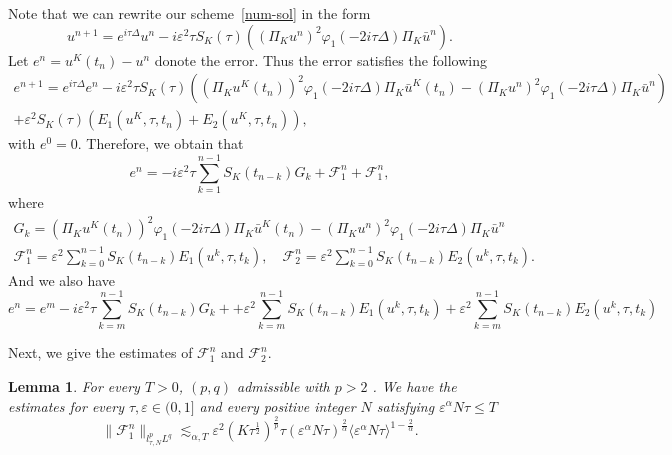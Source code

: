 \documentclass[10pt,a4paper]{article}
\newtheorem{lemma}[theorem]{Lemma}
\begin{document}
  Note that we can rewrite our scheme~\eqref{num-sol} in the form 
  \[ 
    u^{n+1} = e^{i\tau\Delta}u^n - i\varepsilon^2\tau S_K(\tau) 
    \left( (\Pi_K u^n)^2 \varphi_1(-2i\tau\Delta)\Pi_K \bar{u}^n \right).
  \]
  Let \( e^n = u^K(t_n) - u^n \) donote the error. Thus the error satisfies 
  the following 
  \begin{multline}
    e^{n+1} = e^{i\tau\Delta}e^n - i \varepsilon^2 \tau S_K(\tau) \left( 
    \left(\Pi_K u^K(t_n)\right)^2 \varphi_1(-2i\tau\Delta)\Pi_K \bar{u}^K(t_n)
    - (\Pi_K u^n)^2 \varphi_1(-2i\tau\Delta)\Pi_K \bar{u}^n \right) \\ 
    + \varepsilon^2 S_K(\tau) \left( E_1(u^K, \tau, t_n) + E_2(u^K, \tau, t_n) 
    \right),
  \end{multline}
  with \( e^0 = 0 \). Therefore, we obtain that 
  \begin{equation}
    e^n = -i \varepsilon^2 \tau \sum_{k=1}^{n-1}
    S_K(t_{n-k})G_k + \mathcal F_1^{n} + \mathcal F_1^{n},
  \end{equation}
  where
  \begin{align}
    \label{Gk} G_k = \left(\Pi_K u^K(t_n)\right)^2 \varphi_1(-2i\tau\Delta)\Pi_K 
    \bar{u}^K(t_n) - (\Pi_K u^n)^2 \varphi_1(-2i\tau\Delta)\Pi_K \bar{u}^n \\
    \label{F1F2} \mathcal F^{n}_1 = \varepsilon^2 \sum_{k=0}^{n-1} S_K(t_{n-k}) E_1(u^k, \tau, t_k), \quad
    \mathcal F^{n}_2 = \varepsilon^2 \sum_{k=0}^{n-1} S_K(t_{n-k}) E_2(u^k, \tau, t_k).
  \end{align}
  And we also have 
  \begin{equation}\label{emn}
    e^n = e^m -i \varepsilon^2 \tau \sum_{k=m}^{n-1}
    S_K(t_{n-k})G_k + 
    + \varepsilon^2 \sum_{k=m}^{n-1} S_K(t_{n-k}) E_1(u^k, \tau, t_k)
    + \varepsilon^2 \sum_{k=m}^{n-1} S_K(t_{n-k}) E_2(u^k, \tau, t_k)
  \end{equation}
  
  Next, we give the estimates of \(\mathcal F^n_1\) and \(\mathcal F^n_2\).
  \begin{lemma}\label{F1} %
    For every \( T > 0 \), \( (p, q) \) admissible with \( p > 2 \) .
    We have the estimates for every \( \tau, \varepsilon
    \in (0,1] \) and every positive integer \(N\) satisfying \(\varepsilon^\alpha
    N\tau \leq T\)
    \begin{equation}
      \| \mathcal F_1^n \|_{l^p_{\tau,N}L^q} \lesssim_{\alpha,T}
      \varepsilon^2 (K\tau^\frac12)^\frac2p \tau 
      {(\varepsilon^\alpha N\tau)}^\frac2\alpha {\langle\varepsilon^\alpha N\tau\rangle}^{1-\frac2\alpha}.%
    \end{equation}
  \end{lemma}
\end{document}
